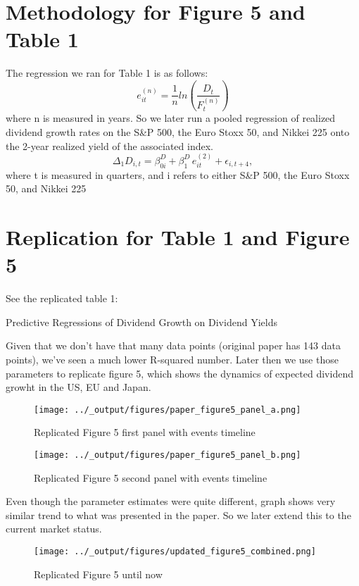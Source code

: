 \documentclass{article}
\begin{document}
\section{Methodology for Figure 5 and Table 1}
The regression we ran for Table 1 is as follows: 
\[
e_{it}^{(n)} = \frac{1}{n}ln(\frac{D_t}{F_t^{(n)}})
\]
where n is measured in years. So we later run a pooled regression of realized dividend growth rates on the S\&P 500, 
the Euro Stoxx 50, and Nikkei 225 onto the 2-year realized yield of the associated index. 
\[
\Delta_1 D_{i,t} 
= \beta_{0i}^D 
+ \beta_{1}^D \, e_{it}^{(2)} 
+ \epsilon_{i,t+4},
\]
where t is measured in quarters, and i refers to either S\&P 500, 
the Euro Stoxx 50, and Nikkei 225
\section{Replication for Table 1 and Figure 5}
See the replicated table 1:
\begin{table}[H]
  \centering
  \caption{Predictive Regressions of Dividend Growth on Dividend Yields}
  
  \label{tab:your_label}
  \end{table}

Given that we don't have that many data points (original paper has 143 data points), 
we've seen a much lower R-squared number. 
Later then we use those parameters to replicate figure 5, which shows the dynamics of expected dividend growht in the US, EU and Japan.
 
\begin{figure}[H]
  \centering
  \texttt{[image: ../\_output/figures/paper\_figure5\_panel\_a.png]} 
  \caption{Replicated Figure 5 first panel with events timeline}
  \label{fig:figure_5}
\end{figure}

\begin{figure}[H]
  \centering
  \texttt{[image: ../\_output/figures/paper\_figure5\_panel\_b.png]} 
  \caption{Replicated Figure 5 second panel with events timeline}
  \label{fig:figure_5}
\end{figure}
Even though the parameter estimates were quite different, graph shows very similar trend to what was presented in the paper.
So we later extend this to the current market status.

\begin{figure}[H]
  \centering
  \texttt{[image: ../\_output/figures/updated\_figure5\_combined.png]}
  \caption{Replicated Figure 5 until now}
  \label{fig:figure_5_current}
\end{figure}
\end{document}
